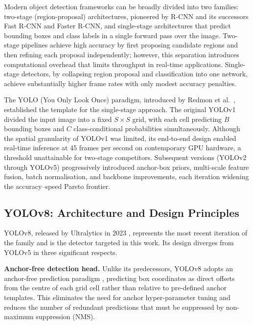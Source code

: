 \documentclass[12pt,a4paper]{report}
\begin{document}
Modern object detection frameworks can be broadly divided into two families:
two-stage (region-proposal) architectures, pioneered by R-CNN
\cite{girshick2014} and its successors Fast R-CNN and Faster R-CNN, and
single-stage architectures that predict bounding boxes and class labels in a
single forward pass over the image. Two-stage pipelines achieve high accuracy
by first proposing candidate regions and then refining each proposal
independently; however, this separation introduces computational overhead that
limits throughput in real-time applications. Single-stage detectors, by
collapsing region proposal and classification into one network, achieve
substantially higher frame rates with only modest accuracy penalties.

The YOLO (You Only Look Once) paradigm, introduced by Redmon et al.\
\cite{redmon2016you}, established the template for the single-stage approach.
The original YOLOv1 divided the input image into a fixed $S \times S$ grid,
with each cell predicting $B$ bounding boxes and $C$ class-conditional
probabilities simultaneously. Although the spatial granularity of YOLOv1 was
limited, its end-to-end design enabled real-time inference at 45 frames per
second on contemporary GPU hardware, a threshold unattainable for two-stage
competitors. Subsequent versions (YOLOv2 through YOLOv5) progressively
introduced anchor-box priors, multi-scale feature fusion, batch normalisation,
and backbone improvements, each iteration widening the accuracy--speed
Pareto frontier.

\subsection{YOLOv8: Architecture and Design Principles}
\label{subsec:yolov8}

YOLOv8, released by Ultralytics in 2023 \cite{jocher2023ultralytics}, represents the
most recent iteration of the family and is the detector targeted in this
work. Its design diverges from YOLOv5 in three significant respects.

\textbf{Anchor-free detection head.} Unlike its predecessors, YOLOv8 adopts
an anchor-free prediction paradigm \cite{tian2019fcos,zhou2019centernet}, predicting box
coordinates as direct offsets from the centre of each grid cell rather than
relative to pre-defined anchor templates. This eliminates the need for anchor
hyper-parameter tuning and reduces the number of redundant predictions that
must be suppressed by non-maximum suppression (NMS).
\end{document}
